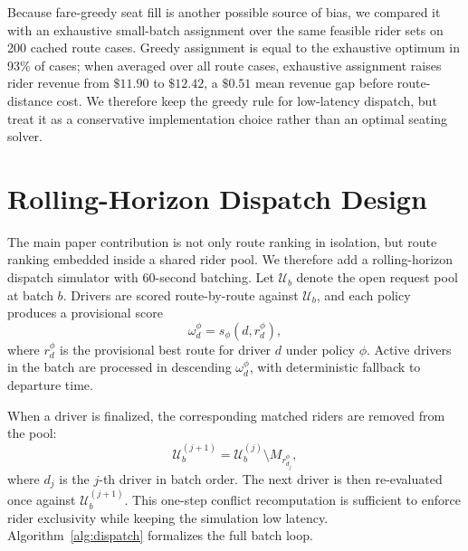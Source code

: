 \documentclass[journal]{IEEEtran}
\begin{document}
Because fare-greedy seat fill is another possible source of bias, we compared it with an exhaustive small-batch assignment over the same feasible rider sets on 200 cached route cases. Greedy assignment is equal to the exhaustive optimum in 93\% of cases; when averaged over all route cases, exhaustive assignment raises rider revenue from \(\$11.90\) to \(\$12.42\), a \(\$0.51\) mean revenue gap before route-distance cost. We therefore keep the greedy rule for low-latency dispatch, but treat it as a conservative implementation choice rather than an optimal seating solver.

\section{Rolling-Horizon Dispatch Design}
The main paper contribution is not only route ranking in isolation, but route ranking embedded inside a shared rider pool. We therefore add a rolling-horizon dispatch simulator with 60-second batching. Let \(\mathcal{U}_b\) denote the open request pool at batch \(b\). Drivers are scored route-by-route against \(\mathcal{U}_b\), and each policy produces a provisional score
\[
\omega_d^\phi=s_\phi\!\left(d,r_d^\phi\right),
\]
where \(r_d^\phi\) is the provisional best route for driver \(d\) under policy \(\phi\). Active drivers in the batch are processed in descending \(\omega_d^\phi\), with deterministic fallback to departure time.

When a driver is finalized, the corresponding matched riders are removed from the pool:
\[
\mathcal{U}_b^{(j+1)}=\mathcal{U}_b^{(j)}\setminus M_{r_{d_j}^{\phi}},
\]
where \(d_j\) is the \(j\)-th driver in batch order. The next driver is then re-evaluated once against \(\mathcal{U}_b^{(j+1)}\). This one-step conflict recomputation is sufficient to enforce rider exclusivity while keeping the simulation low latency. Algorithm~\ref{alg:dispatch} formalizes the full batch loop.
\end{document}
